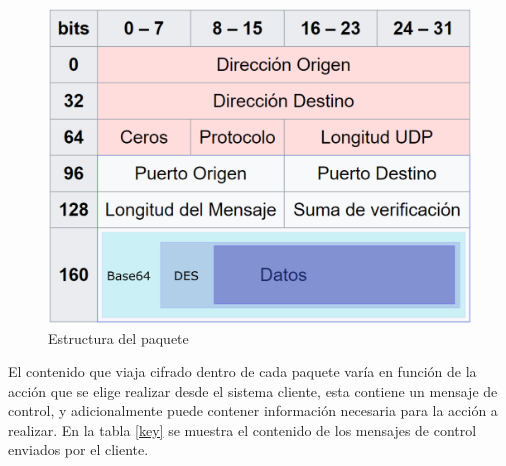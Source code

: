 \documentclass[12pt]{article}
\begin{document}
            \begin{figure}[h!]
            \centering
                \includegraphics[scale=0.4]{ip_packet.eps}
                \caption*{Estructura del paquete}
                \label{fig:ip_packet}
            \end{figure}

            El contenido que viaja cifrado dentro de cada paquete varía en función de la acción que se elige realizar desde el sistema cliente, esta contiene un mensaje de control, y adicionalmente puede contener información necesaria para la acción a realizar. En la tabla \ref{key}  se muestra el contenido de los mensajes de control enviados por el cliente.
\end{document}
